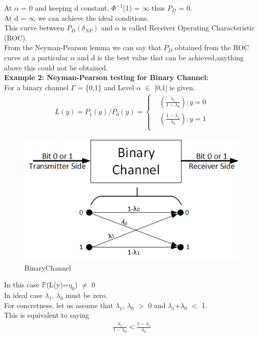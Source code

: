 \documentclass[12pt]{report}
\begin{document}
At $\alpha$ = 0 and keeping d constant, $\Phi^{-1}$(1) = $\infty$ thus $P_D$ = 0.\\
At d = $\infty$ we can achieve the ideal conditions.\\ 
This curve between  $P_D(\delta_{NP})$ and $\alpha$ is called Receiver Operating Characteristic (ROC).\\
From the Neyman-Pearson lemma we can say that $P_D$ obtained from the ROC curve at a particular $\alpha$ and d is the best value that can be achieved,anything above this could not be obtained.\\[80pt]
{\bf Example 2: Neyman-Pearson testing for Binary Channel:}\\
For a binary channel $\Gamma$ = \{0,1\} and
Level $\alpha$ $\in$ [0,1] is given.\\[-10pt]
\begin{align*}
L(y) = P_1(y)/P_0(y) = \begin{cases}& (\frac{\lambda_1}{1-\lambda_0}) ; y=0\\
& (\frac{1-\lambda_1}{\lambda_0}) ; y=1\\
\end{cases}
\end{align*}
\begin{figure}[h]
\centering
\includegraphics[scale=0.9]{Figures/BinaryChannel}
\caption{BinaryChannel}
\label{fig:binarychannel}
\end{figure}
In this case $\mathbb{P}$(L(y)=$\eta_0$) $\ne$ 0\\ 
In ideal case $\lambda_1$, $\lambda_0$ must be zero.\\
For concretness, let us assume that  $\lambda_1$, $\lambda_0$ $>$ 0 and $\lambda_1$+$\lambda_0$ $<$ 1.\\
This is equivalent to saying 
\begin{align*}
\frac{\lambda_1}{1-\lambda_0} < \frac{1-\lambda_1}{\lambda_0}\\
\end{align*}
\end{document}
